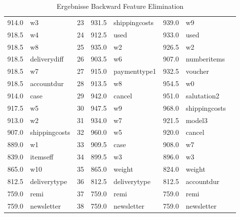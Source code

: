 \begin{table}[]
\begin{tabular*}{\textwidth}{c @{\extracolsep{\fill}} lllllll}
914.0 & w3 & 23 & 931.5 & shippingcosts & 939.0 & w9\\
918.5 & w4 & 24 & 912.5 & used & 933.0 & used\\
918.5 & w8 & 25 & 935.0 & w2 & 926.5 & w2\\
918.5 & deliverydiff & 26 & 903.5 & w6 & 907.0 & numberitems\\
918.5 & w7 & 27 & 915.0 & paymenttype1 & 932.5 & voucher\\
918.5 & accountdur & 28 & 913.5 & w8 & 954.5 & w0\\
914.0 & case & 29 & 942.0 & cancel & 951.0 & salutation2\\
917.5 & w5 & 30 & 947.5 & w9 & 968.0 & shippingcosts\\
913.0 & w2 & 31 & 934.0 & w7 & 921.5 & model3\\
907.0 & shippingcosts & 32 & 960.0 & w5 & 920.0 & cancel\\
889.0 & w1 & 33 & 909.5 & case & 908.0 & w7\\
839.0 & itemseff & 34 & 899.5 & w3 & 896.0 & w3\\
865.0 & w10 & 35 & 865.0 & weight & 824.0 & weight\\
812.5 & deliverytype & 36 & 812.5 & deliverytype & 812.5 & accountdur\\
759.0 & remi & 37 & 759.0 & remi & 759.0 & remi\\
759.0 & newsletter & 38 & 759.0 & newsletter & 759.0 & newsletter\\
\bottomrule
\end{tabular*}
\caption{Ergebnisse Backward Feature Elimination}
\label{table: Backward}
\end{table}
\FloatBarrier
 
 

